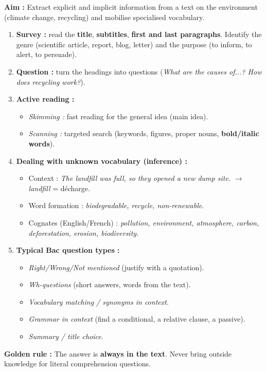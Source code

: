 \documentclass[11pt]{article}
\newcommand{\cle}[1]{{\popxbold\color{popdark}#1}}
\begin{document}
\begin{methode}
\textbf{Aim :} Extract explicit and implicit information from a text on the environment (climate change, recycling) and mobilise specialised vocabulary.
\begin{enumerate}
    \item \textbf{Survey :} read the \textbf{title}, \textbf{subtitles}, \textbf{first and last paragraphs}. Identify the \cle{genre} (scientific article, report, blog, letter) and the \cle{purpose} (to inform, to alert, to persuade).
    \item \textbf{Question :} turn the headings into questions (\textit{What are the causes of...? How does recycling work?}).
    \item \textbf{Active reading :}
    \begin{itemize}
        \item \textit{Skimming :} fast reading for the general idea (main idea).
        \item \textit{Scanning :} targeted search (keywords, figures, proper nouns, \textbf{bold/italic words}).
    \end{itemize}
    \item \textbf{Dealing with unknown vocabulary (inference) :}
    \begin{itemize}
        \item Context : \textit{The \cle{landfill} was full, so they opened a new dump site.} $\rightarrow$ \textit{landfill} = décharge.
        \item Word formation : \textit{\cle{bio}degradable, \cle{re}cycle, \cle{non}-renewable}.
        \item Cognates (English/French) : \textit{pollution, environment, atmosphere, carbon, deforestation, erosion, biodiversity}.
    \end{itemize}
    \item \textbf{Typical Bac question types :}
    \begin{itemize}
        \item \textit{Right/Wrong/Not mentioned} (justify with a quotation).
        \item \textit{Wh-questions} (short answers, words from the text).
        \item \textit{Vocabulary matching / synonyms in context}.
        \item \textit{Grammar in context} (find a conditional, a relative clause, a passive).
        \item \textit{Summary / title choice}.
    \end{itemize}
\end{enumerate}
\textbf{Golden rule :} The answer is \textbf{always in the text}. Never bring outside knowledge for literal comprehension questions.
\end{methode}
\end{document}
